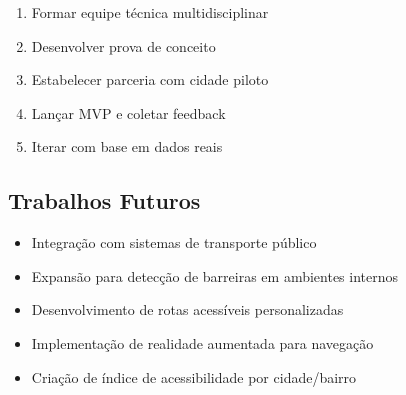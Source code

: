 \documentclass[12pt,a4paper]{article}
\begin{document}
\begin{enumerate}
    \item Formar equipe técnica multidisciplinar
    \item Desenvolver prova de conceito
    \item Estabelecer parceria com cidade piloto
    \item Lançar MVP e coletar feedback
    \item Iterar com base em dados reais
\end{enumerate}

\subsection{Trabalhos Futuros}

\begin{itemize}
    \item Integração com sistemas de transporte público
    \item Expansão para detecção de barreiras em ambientes internos
    \item Desenvolvimento de rotas acessíveis personalizadas
    \item Implementação de realidade aumentada para navegação
    \item Criação de índice de acessibilidade por cidade/bairro
\end{itemize}
\end{document}
